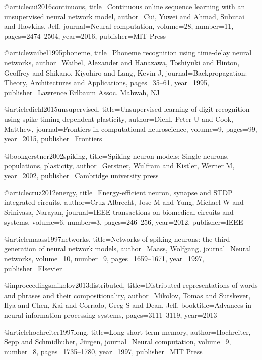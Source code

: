 @article{cui2016continuous,
  title={Continuous online sequence learning with an unsupervised neural network model},
  author={Cui, Yuwei and Ahmad, Subutai and Hawkins, Jeff},
  journal={Neural computation},
  volume={28},
  number={11},
  pages={2474--2504},
  year={2016},
  publisher={MIT Press}
}

@article{waibel1995phoneme,
  title={Phoneme recognition using time-delay neural networks},
  author={Waibel, Alexander and Hanazawa, Toshiyuki and Hinton, Geoffrey and Shikano, Kiyohiro and Lang, Kevin J},
  journal={Backpropagation: Theory, Architectures and Applications},
  pages={35--61},
  year={1995},
  publisher={Lawrence Erlbaum Assoc. Mahwah, NJ}
}

@article{diehl2015unsupervised,
  title={Unsupervised learning of digit recognition using spike-timing-dependent plasticity},
  author={Diehl, Peter U and Cook, Matthew},
  journal={Frontiers in computational neuroscience},
  volume={9},
  pages={99},
  year={2015},
  publisher={Frontiers}
}

@book{gerstner2002spiking,
  title={Spiking neuron models: Single neurons, populations, plasticity},
  author={Gerstner, Wulfram and Kistler, Werner M},
  year={2002},
  publisher={Cambridge university press}
}

@article{cruz2012energy,
  title={Energy-efficient neuron, synapse and STDP integrated circuits},
  author={Cruz-Albrecht, Jose M and Yung, Michael W and Srinivasa, Narayan},
  journal={IEEE transactions on biomedical circuits and systems},
  volume={6},
  number={3},
  pages={246--256},
  year={2012},
  publisher={IEEE}
}

@article{maass1997networks,
  title={Networks of spiking neurons: the third generation of neural network models},
  author={Maass, Wolfgang},
  journal={Neural networks},
  volume={10},
  number={9},
  pages={1659--1671},
  year={1997},
  publisher={Elsevier}
}

@inproceedings{mikolov2013distributed,
  title={Distributed representations of words and phrases and their compositionality},
  author={Mikolov, Tomas and Sutskever, Ilya and Chen, Kai and Corrado, Greg S and Dean, Jeff},
  booktitle={Advances in neural information processing systems},
  pages={3111--3119},
  year={2013}
}

@article{hochreiter1997long,
  title={Long short-term memory},
  author={Hochreiter, Sepp and Schmidhuber, J{\"u}rgen},
  journal={Neural computation},
  volume={9},
  number={8},
  pages={1735--1780},
  year={1997},
  publisher={MIT Press}
}


